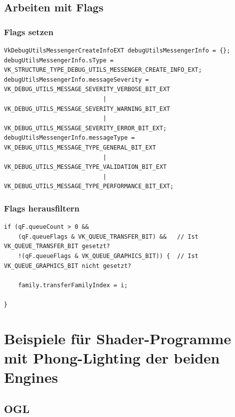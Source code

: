 \documentclass[titlepage, 11pt, a4paper, ngerman]{article}
\begin{document}
\subsection{Arbeiten mit Flags}
\subsubsection{Flags setzen}
\begin{verbatim}
VkDebugUtilsMessengerCreateInfoEXT debugUtilsMessengerInfo = {};
debugUtilsMessengerInfo.sType = VK_STRUCTURE_TYPE_DEBUG_UTILS_MESSENGER_CREATE_INFO_EXT;
debugUtilsMessengerInfo.messageSeverity = VK_DEBUG_UTILS_MESSAGE_SEVERITY_VERBOSE_BIT_EXT
                            | VK_DEBUG_UTILS_MESSAGE_SEVERITY_WARNING_BIT_EXT
                            | VK_DEBUG_UTILS_MESSAGE_SEVERITY_ERROR_BIT_EXT;
debugUtilsMessengerInfo.messageType = VK_DEBUG_UTILS_MESSAGE_TYPE_GENERAL_BIT_EXT
                            | VK_DEBUG_UTILS_MESSAGE_TYPE_VALIDATION_BIT_EXT
                            | VK_DEBUG_UTILS_MESSAGE_TYPE_PERFORMANCE_BIT_EXT;
\end{verbatim}

\subsubsection{Flags herausfiltern}
\begin{verbatim}
if (qF.queueCount > 0 && 
    (qF.queueFlags & VK_QUEUE_TRANSFER_BIT) &&   // Ist VK_QUEUE_TRANSFER_BIT gesetzt?
    !(qF.queueFlags & VK_QUEUE_GRAPHICS_BIT)) {  // Ist VK_QUEUE_GRAPHICS_BIT nicht gesetzt?
                
    family.transferFamilyIndex = i;
                
}
\end{verbatim}

\newpage
\section{Beispiele für Shader-Programme mit Phong-Lighting der beiden Engines}
\subsection{OGL}
\end{document}
